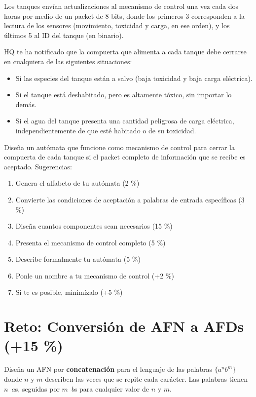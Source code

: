 \documentclass[8pt, onside]{article}
\begin{document}
Los tanques envían actualizaciones al mecanismo de control una vez cada dos horas por medio de un packet de 8 bits, donde los primeros 3 corresponden a la lectura de los sensores (movimiento, toxicidad y carga, en ese orden), y los últimos 5 al ID del tanque (en binario).

HQ te ha notificado que la compuerta que alimenta a cada tanque debe cerrarse en cualquiera de las siguientes situaciones:

\begin{itemize}
    \itemsep0em
    \item Si las especies del tanque están a salvo (baja toxicidad y baja carga eléctrica).
    \item Si el tanque está deshabitado, pero es altamente tóxico, sin importar lo demás.
    \item Si el agua del tanque presenta una cantidad peligrosa de carga eléctrica, independientemente de que esté habitado o de su toxicidad.
\end{itemize}

Diseña un autómata que funcione como mecanismo de control para cerrar la compuerta de cada tanque si el packet completo de información que se recibe es aceptado. Sugerencias:

\begin{enumerate}[label=\tt \alph*)]
    \itemsep0em
    \item Genera el alfabeto de tu autómata (2 \%)
    \item Convierte las condiciones de aceptación a palabras de entrada específicas (3 \%)
    \item Diseña cuantos componentes sean necesarios (15 \%)
    \item Presenta el mecanismo de control completo (5 \%)
    \item Describe formalmente tu autómata (5 \%)
    \item Ponle un nombre a tu mecanismo de control (+2 \%)
    \item Si te es posible, minimízalo (+5 \%)
\end{enumerate}

\section*{Reto: Conversión de AFN a AFDs (+15 \%)}

Diseña un AFN por \textbf{concatenación} para el lenguaje de las palabras $\{a^n b^m\}$ donde $n$ y $m$ describen las veces que se repite cada carácter.
Las palabras tienen $n \,$ $a$s, seguidas por $m \,$ $b$s para cualquier valor de $n$ y $m$.
\end{document}
